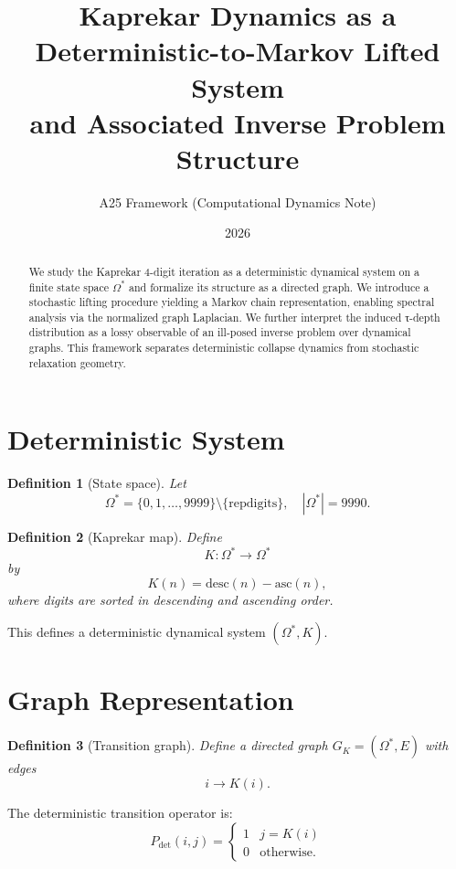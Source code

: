 \documentclass[11pt]{article}
\title{Kaprekar Dynamics as a Deterministic-to-Markov Lifted System\\
and Associated Inverse Problem Structure}
\author{A25 Framework (Computational Dynamics Note)}
\date{2026}
\newtheorem{definition}{Definition}
\begin{document}
\maketitle

\begin{abstract}
We study the Kaprekar 4-digit iteration as a deterministic dynamical system on a finite state space $\Omega^*$ and formalize its structure as a directed graph. We introduce a stochastic lifting procedure yielding a Markov chain representation, enabling spectral analysis via the normalized graph Laplacian. We further interpret the induced τ-depth distribution as a lossy observable of an ill-posed inverse problem over dynamical graphs. This framework separates deterministic collapse dynamics from stochastic relaxation geometry.
\end{abstract}

\section{Deterministic System}

\begin{definition}[State space]
Let
\[
\Omega^* = \{0,1,\dots,9999\} \setminus \{\text{repdigits}\},
\quad |\Omega^*| = 9990.
\]
\end{definition}

\begin{definition}[Kaprekar map]
Define
\[
K : \Omega^* \to \Omega^*
\]
by
\[
K(n) = \mathrm{desc}(n) - \mathrm{asc}(n),
\]
where digits are sorted in descending and ascending order.
\end{definition}

This defines a deterministic dynamical system $(\Omega^*, K)$.

\section{Graph Representation}

\begin{definition}[Transition graph]
Define a directed graph $G_K = (\Omega^*, E)$ with edges
\[
i \to K(i).
\]
\end{definition}

The deterministic transition operator is:
\[
P_{\mathrm{det}}(i,j) =
\begin{cases}
1 & j = K(i) \\
0 & \text{otherwise}.
\end{cases}
\]
\end{document}
